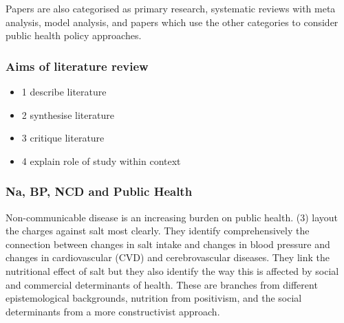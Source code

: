 \documentclass[
]{article}
\providecommand{\tightlist}{%
  \setlength{\itemsep}{0pt}\setlength{\parskip}{0pt}}
\begin{document}
Papers are also categorised as primary research, systematic reviews with
meta analysis, model analysis, and papers which use the other categories
to consider public health policy approaches.

\hypertarget{aims-of-literature-review}{%
\subsubsection{Aims of literature
review}\label{aims-of-literature-review}}

\begin{itemize}
\tightlist
\item
  1 describe literature
\item
  2 synthesise literature
\item
  3 critique literature
\item
  4 explain role of study within context
\end{itemize}

\hypertarget{na-bp-ncd-and-public-health}{%
\subsubsection{Na, BP, NCD and Public
Health}\label{na-bp-ncd-and-public-health}}

Non-communicable disease is an increasing burden on public health. (3)
layout the charges against salt most clearly. They identify
comprehensively the connection between changes in salt intake and
changes in blood pressure and changes in cardiovascular (CVD) and
cerebrovascular diseases. They link the nutritional effect of salt but
they also identify the way this is affected by social and commercial
determinants of health. These are branches from different
epistemological backgrounds, nutrition from positivism, and the social
determinants from a more constructivist approach.
\end{document}
